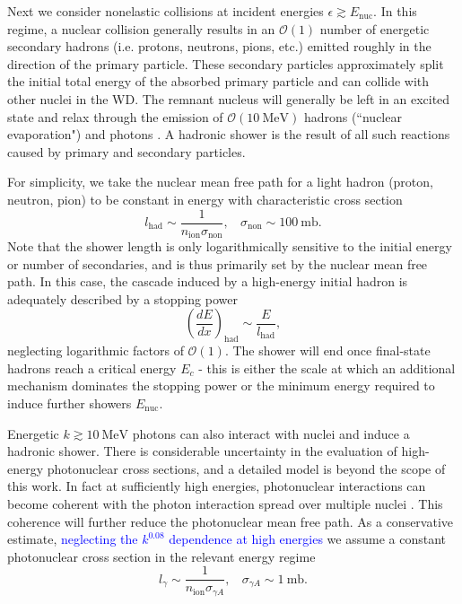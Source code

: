 \documentclass[twocolumn,showpacs,preprintnumbers,amsmath,amssymb,prd]{revtex4}
\newcommand{\OO}{\mathcal{O}}
\def\r{\right)}
\def\l{\left(}
\begin{document}
\begin{appendices}
Next we consider nonelastic collisions at incident energies $\epsilon \gtrsim E_\text{nuc}$. In this regime, a nuclear collision generally results in an $\OO(1)$ number of energetic secondary hadrons (i.e. protons, neutrons, pions, etc.) emitted roughly in the direction of the primary particle. These secondary particles approximately split the initial total energy of the absorbed primary particle and can collide with other nuclei in the WD. The remnant nucleus will generally be left in an excited state and relax through the emission of $\OO(10 ~\text{MeV})$ hadrons (``nuclear evaporation") and photons \cite{Rossi}. A hadronic shower is the result of all such reactions caused by primary and secondary particles.

For simplicity, we take the nuclear mean free path for a light hadron (proton, neutron, pion) to be constant in energy with characteristic cross section
\begin{equation}
l_\text{had} \sim  \frac{1}{n_\text{ion} \sigma_\text{non}}, ~~~~ \sigma_\text{non} \sim 100 ~\text{mb}.
\end{equation}
Note that the shower length is only logarithmically sensitive to the initial energy or number of secondaries, and is thus primarily set by the nuclear mean free path. In this case, the cascade induced by a high-energy initial hadron is adequately described by a stopping power
\begin{equation}
\label{eq:nucshower}
\l \frac{dE}{dx}\r_\text{had} \sim \frac{E}{l_\text{had}},
\end{equation}
neglecting logarithmic factors of $\OO(1)$. The shower will end once final-state hadrons reach a critical energy $E_c$ - this is either the scale at which an additional mechanism dominates the stopping power or the minimum energy required to induce further showers $E_\text{nuc}$.

Energetic $k \gtrsim 10 ~\text{MeV}$ photons can also interact with nuclei and induce a hadronic shower. There is considerable uncertainty in the evaluation of high-energy photonuclear cross sections, and a detailed model is beyond the scope of this work. In fact at sufficiently high energies, photonuclear interactions can become coherent with the photon interaction spread over multiple nuclei \cite{Gerhardt:2010bj}. This coherence will further reduce the photonuclear mean free path. As a conservative estimate, \textcolor{blue}{neglecting the $k^{0.08}$ dependence at high energies} we assume a constant photonuclear cross section in the relevant energy regime
\begin{equation}
l_\gamma \sim \frac{1}{n_\text{ion} \sigma_{\gamma A}}, ~~~~ \sigma_{\gamma A} \sim 1 ~\text{mb}.
\end{equation}


\end{appendices}
\end{document}
